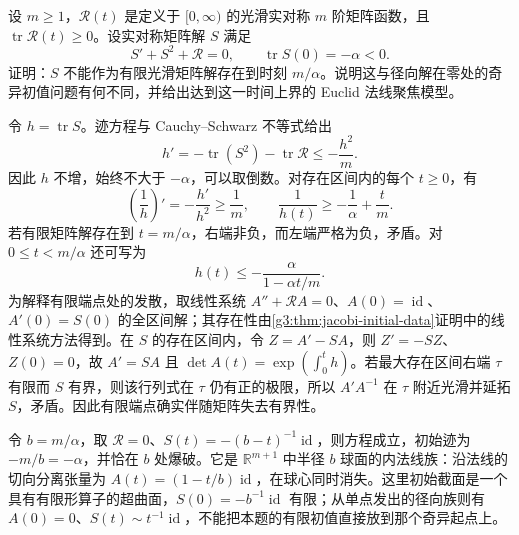 \begin{exercise}\label{g3:ex:regular-riccati-focusing}
	设 \(m\ge1\)，\(\mathcal R(t)\) 是定义于 \([0,\infty)\) 的光滑实对称 \(m\) 阶矩阵函数，且 \(\operatorname{tr}\mathcal R(t)\ge0\)。设实对称矩阵解 \(S\) 满足
	\[
		S'+S^2+\mathcal R=0,\qquad \operatorname{tr}S(0)=-\alpha<0.
	\]
	证明：\(S\) 不能作为有限光滑矩阵解存在到时刻 \(m/\alpha\)。说明这与径向解在零处的奇异初值问题有何不同，并给出达到这一时间上界的 Euclid 法线聚焦模型。
\end{exercise}
\begin{solution}
	令 \(h=\operatorname{tr}S\)。迹方程与 Cauchy--Schwarz 不等式给出
	\[
		h'=-\operatorname{tr}(S^2)-\operatorname{tr}\mathcal R
		\le-\frac{h^2}{m}.
	\]
	因此 \(h\) 不增，始终不大于 \(-\alpha\)，可以取倒数。对存在区间内的每个 \(t\ge0\)，有
	\[
		\left(\frac1h\right)'=-\frac{h'}{h^2}\ge\frac1m,
		\qquad
		\frac1{h(t)}\ge-\frac1\alpha+\frac tm.
	\]
	若有限矩阵解存在到 \(t=m/\alpha\)，右端非负，而左端严格为负，矛盾。对 \(0\le t<m/\alpha\) 还可写为
	\[
		h(t)\le-\frac{\alpha}{1-\alpha t/m}.
	\]
	为解释有限端点处的发散，取线性系统 \(A''+\mathcal R A=0\)、\(A(0)=\operatorname{id}\)、\(A'(0)=S(0)\) 的全区间解；其存在性由\cref{g3:thm:jacobi-initial-data}证明中的线性系统方法得到。在 \(S\) 的存在区间内，令 \(Z=A'-SA\)，则 \(Z'=-SZ\)、\(Z(0)=0\)，故 \(A'=SA\) 且 \(\det A(t)=\exp(\int_0^t h)\)。若最大存在区间右端 \(\tau\) 有限而 \(S\) 有界，则该行列式在 \(\tau\) 仍有正的极限，所以 \(A'A^{-1}\) 在 \(\tau\) 附近光滑并延拓 \(S\)，矛盾。因此有限端点确实伴随矩阵失去有界性。

	令 \(b=m/\alpha\)，取 \(\mathcal R=0\)、\(S(t)=-(b-t)^{-1}\operatorname{id}\)，则方程成立，初始迹为 \(-m/b=-\alpha\)，并恰在 \(b\) 处爆破。它是 \(\mathbb R^{m+1}\) 中半径 \(b\) 球面的内法线族：沿法线的切向分离张量为
	\(A(t)=(1-t/b)\operatorname{id}\)，在球心同时消失。这里初始截面是一个具有有限形算子的超曲面，\(S(0)=-b^{-1}\operatorname{id}\) 有限；从单点发出的径向族则有 \(A(0)=0\)、\(S(t)\sim t^{-1}\operatorname{id}\)，不能把本题的有限初值直接放到那个奇异起点上。
\end{solution}

